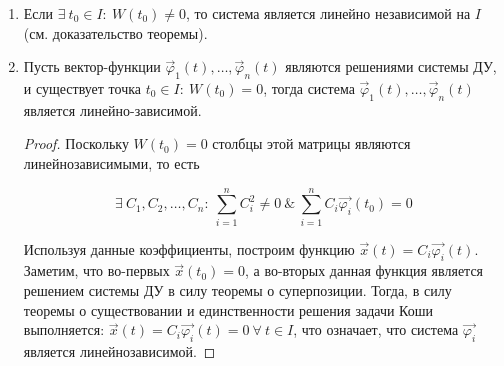     \begin{enumerate}
        \item Если $\exists ~ t_0 \in I : ~ W(t_0) \neq 0$, то система является линейно независимой на $I$ (см. доказательство теоремы).
        \item Пусть вектор-функции $\vec \varphi_1(t), \dots, \vec \varphi_n(t)$ являются решениями системы ДУ, и существует точка
        $t_0 \in I: ~ W(t_0) = 0$, тогда система $\vec \varphi_1(t), \dots, \vec \varphi_n(t)$ является линейно-зависимой.

        \begin{proof}
        	Поскольку $W(t_0) = 0$ столбцы этой матрицы являются линейнозависимыми, то есть 
        	
        	\[ \exists ~ C_1, C_2, \dots, C_n : ~ \sum_{i = 1}^n C_i^2 \neq 0 ~ \& ~ \sum_{i = 1}^n C_i \vec{\varphi_i}(t_0) = 0 \]
        	
        	Используя данные коэффициенты, построим функцию $\vec{x}(t) = C_i \vec{\varphi_i}(t)$. Заметим, что во-первых $\vec{x}(t_0) = 0$, а во-вторых данная функция является решением системы ДУ в силу теоремы о суперпозиции. Тогда, в силу теоремы о существовании и единственности решения задачи Коши выполняется: $\vec{x}(t) = C_i \vec{\varphi_i}(t) = 0 ~ \forall ~ t \in I$, что означает, что система $\vec{\varphi_i}$ является линейнозависимой.
        \end{proof}
    \end{enumerate}

